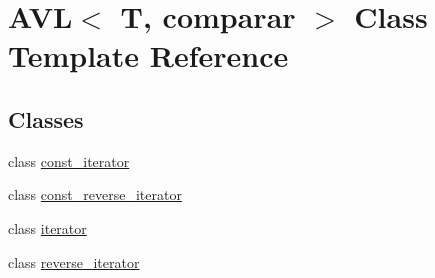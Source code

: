 \hypertarget{classAVL}{\section{A\-V\-L$<$ T, comparar $>$ Class Template Reference}
\label{classAVL}
}
\subsection*{Classes}
\begin{DoxyCompactItemize}
\item 
class \hyperlink{classAVL_1_1const__iterator}{const\-\_\-iterator}
\item 
class \hyperlink{classAVL_1_1const__reverse__iterator}{const\-\_\-reverse\-\_\-iterator}
\item 
class \hyperlink{classAVL_1_1iterator}{iterator}
\item 
class \hyperlink{classAVL_1_1reverse__iterator}{reverse\-\_\-iterator}
\end{DoxyCompactItemize}
